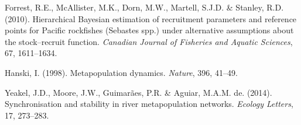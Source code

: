 \documentclass[
]{article}
\begin{document}
\leavevmode\hypertarget{ref-Forrest2010}{}%
Forrest, R.E., McAllister, M.K., Dorn, M.W., Martell, S.J.D. \& Stanley,
R.D. (2010). Hierarchical Bayesian estimation of recruitment parameters
and reference points for Pacific rockfishes (Sebastes spp.) under
alternative assumptions about the stock--recruit function.
\emph{Canadian Journal of Fisheries and Aquatic Sciences}, 67,
1611--1634.

\leavevmode\hypertarget{ref-Hanski1998}{}%
Hanski, I. (1998). Metapopulation dynamics. \emph{Nature}, 396, 41--49.

\leavevmode\hypertarget{ref-Yeakel2014}{}%
Yeakel, J.D., Moore, J.W., Guimarães, P.R. \& Aguiar, M.A.M. de. (2014).
Synchronisation and stability in river metapopulation networks.
\emph{Ecology Letters}, 17, 273--283.
\end{document}
